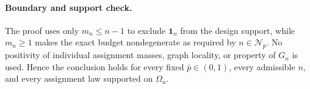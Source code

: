 \paragraph{Boundary and support check.}
The proof uses only \(m_n\le n-1\) to exclude \(\mathbf 1_n\) from the design support, while \(m_n\ge1\) makes the exact budget nondegenerate as required by \(n\in\mathcal N_{\bar p}\).  No positivity of individual assignment masses, graph locality, or property of \(G_n\) is used.  Hence the conclusion holds for every fixed \(\bar p\in(0,1)\), every admissible \(n\), and every assignment law supported on \(\Omega_n\).